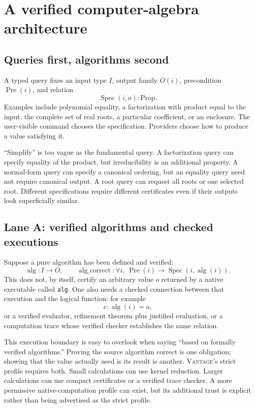 \documentclass[11pt,a4paper]{article}
\newcommand{\code}[1]{\nolinkurl{#1}}
\newcommand{\Vantage}{\textsc{Vantage}}
\newcommand{\Spec}{\operatorname{Spec}}
\theoremstyle{definition}
\begin{document}
\section{A verified computer-algebra architecture}\label{sec:cas}
\subsection{Queries first, algorithms second}
A typed query fixes an input type \(I\), output family \(O(i)\), precondition
\(\operatorname{Pre}(i)\), and relation
\[
 \Spec(i,o):\mathrm{Prop}.
\]
Examples include polynomial equality, a factorization with product equal to the
input, the complete set of real roots, a particular coefficient, or an enclosure.
The user-visible command chooses the specification. Providers choose how to
produce a value satisfying it.

``Simplify'' is too vague as the fundamental query. A factorization query can
specify equality of the product, but irreducibility is an additional property.
A normal-form query can specify a canonical ordering, but an equality query need
not require canonical output. A root query can request all roots or one selected
root. Different specifications require different certificates even if their
outputs look superficially similar.

\subsection{Lane A: verified algorithms and checked executions}
Suppose a pure algorithm has been defined and verified:
\[
 \operatorname{alg}:I\to O,
 \qquad
 \operatorname{alg\_correct}:\forall i,\ \operatorname{Pre}(i)
       \to\Spec(i,\operatorname{alg}(i)).
\]
This does not, by itself, certify an arbitrary value \(o\) returned by a native
executable called \code{alg}. One also needs a checked connection between that
execution and the logical function: for example
\[
 e:\operatorname{alg}(i)=o,
\]
or a verified evaluator, refinement theorem plus justified evaluation, or a
computation trace whose verified checker establishes the same relation.

This execution boundary is easy to overlook when saying ``based on formally
verified algorithms.'' Proving the source algorithm correct is one obligation;
showing that the value actually used is its result is another. \Vantage's strict
profile requires both. Small calculations can use kernel reduction. Larger
calculations can use compact certificates or a verified trace checker. A more
permissive native-computation profile can exist, but its additional trust is
explicit rather than being advertised as the strict profile.
\end{document}

